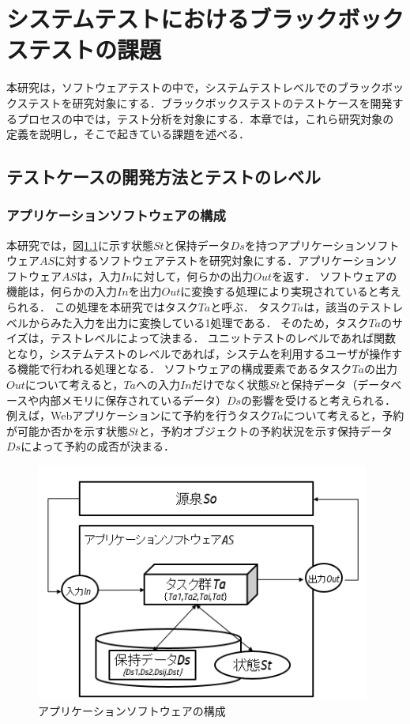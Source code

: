 \chapter{システムテストにおけるブラックボックステストの課題}
本研究は，ソフトウェアテストの中で，システムテストレベルでのブラックボックステストを研究対象にする．ブラックボックステストのテストケースを開発するプロセスの中では，テスト分析を対象にする．本章では，これら研究対象の定義を説明し，そこで起きている課題を述べる．

\newpage
\section{テストケースの開発方法とテストのレベル}
\subsection{アプリケーションソフトウェアの構成}
本研究では，図\ref{fig:fig-1}に示す状態$St$と保持データ$Ds$を持つアプリケーションソフトウェア$AS$に対するソフトウェアテストを研究対象にする．アプリケーションソフトウェア$AS$は，入力$In$に対して，何らかの出力$Out$を返す．
ソフトウェアの機能は，何らかの入力$In$を出力$Out$に変換する処理により実現されていると考えられる．
この処理を本研究ではタスク$Ta$と呼ぶ．
タスク$Ta$は，該当のテストレベルからみた入力を出力に変換している1処理である．
そのため，タスク$Ta$のサイズは，テストレベルによって決まる．
ユニットテストのレベルであれば関数となり，システムテストのレベルであれば，システムを利用するユーザが操作する機能で行われる処理となる．
ソフトウェアの構成要素であるタスク$Ta$の出力$Out$について考えると，$Ta$への入力$In$だけでなく状態$St$と保持データ（データベースや内部メモリに保存されているデータ）$Ds$の影響を受けると考えられる．
例えば，Webアプリケーションにて予約を行うタスク$Ta$について考えると，予約が可能か否かを示す状態$St$と，予約オブジェクトの予約状況を示す保持データ$Ds$によって予約の成否が決まる．

\begin{figure}[H]
  \begin{center}
  \includegraphics[width=11cm]{./image/fig-1.png}
  \caption{アプリケーションソフトウェアの構成}
  \label{fig:fig-1}
  \end{center}
\end{figure}

